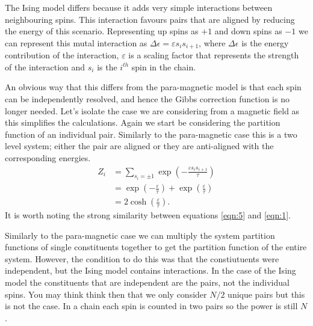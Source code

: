 \documentclass[a4paper]{article}
\begin{document}
\begin{multicols}{2}
        The Ising model differs because it adds very simple interactions %
        between neighbouring spins. This interaction favours pairs that %
        are aligned by reducing the energy of this scenario. Representing %
        up spins as \(+1\) and down spins as \(-1\) we can represent this %
        mutal interaction as \(\Delta \epsilon = \varepsilon s_{i}s_{i + 1}\), %
        where \(\Delta \epsilon\) is the energy contribution of the %
        interaction, \(\varepsilon\) is a scaling factor that represents %
        the strength of the interaction and \(s_{i}\) is the \(i^{th}\) %
        spin in the chain. 


        An obvious way that this differs from the para-magnetic model %
        is that each spin can be independently resolved, and hence %
        the Gibbs correction function is no longer needed. Let's isolate %
        the case we are considering from a magnetic field as this simplifies %
        the calculations. Again we start be considering the partition %
        function of an individual pair. Similarly to the para-magnetic case %
        this is a two level system; either the pair are aligned or they %
        are anti-aligned with the corresponding energies.
        \begin{align}
            Z_{i} &= \sum_{s_{i} = \pm 1}
                    \exp\left(-\frac{\varepsilon s_{i}s_{i+1}}{\tau}\right)
                    \nonumber\\
                &= \exp\left(-\frac{\varepsilon}{\tau}\right) +
                    \exp\left(\frac{\varepsilon}{\tau}\right)
                    \nonumber\\
                &= 2\cosh\left(\frac{\varepsilon}{\tau}\right).
           \label{eqn:5}
        \end{align}
        It is worth noting the strong similarity between equations %
        \ref{eqn:5} and \ref{eqn:1}. 


        Similarly to the para-magnetic case we can multiply the system %
        partition functions of single constituents together to get the %
        partition function of the entire system. However, the condition %
        to do this was that the constiutuents were independent, but the %
        Ising model contains interactions. In the case of the Ising model %
        the constituents that are independent are the pairs, not the %
        individual spins. You may think think then that we only consider %
        \(N / 2\) unique pairs but this is not the case. In a chain each %
        spin is counted in two pairs so the power is still \(N\). 



\end{multicols}
\end{document}
